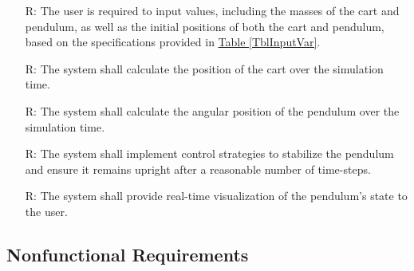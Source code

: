 \documentclass[12pt]{article}
\newcounter{reqnum} %
\begin{document}
\noindent \begin{itemize}

\item[R\refstepcounter{reqnum}\thereqnum \label{R_Inputs}:]
    The user is required to input values,
    including the masses of the cart and pendulum,
    as well as the initial positions of both the cart and pendulum,
    based on the specifications provided in \hyperref[TblInputVar]{Table \ref*{TblInputVar}}.

\item[R\refstepcounter{reqnum}\thereqnum \label{R_cart_position}:]
    The system shall calculate the position of
    the cart over the simulation time.

\item[R\refstepcounter{reqnum}\thereqnum \label{R_pendulum_position}:]
    The system shall calculate the angular position
    of the pendulum over the simulation time.

\item[R\refstepcounter{reqnum}\thereqnum \label{R_control_system}:]
    The system shall implement control strategies to stabilize 
    the pendulum and ensure it remains upright after 
    a reasonable number of time-steps.

\item[R\refstepcounter{reqnum}\thereqnum \label{R_Output}:]
    The system shall provide real-time visualization of the pendulum's state to the user.

\end{itemize}


\subsection{Nonfunctional Requirements}
\end{document}
